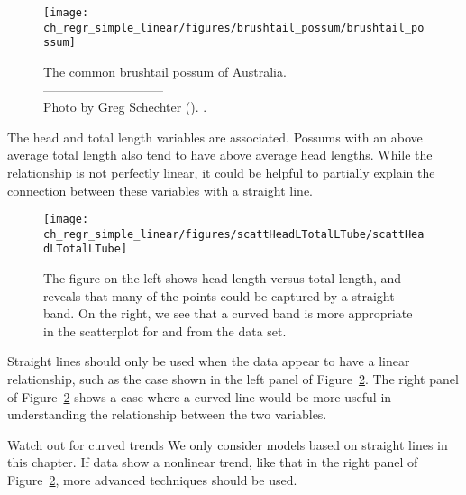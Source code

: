 \setlength{\captionwidth}{0.83\mycaptionwidth}
\begin{figure}
   \centering
   \texttt{[image: ch\_regr\_simple\_linear/figures/brushtail\_possum/brushtail\_possum]}
   \caption{The common brushtail possum of Australia.\vspace{-1mm} \\
   -----------------------------\vspace{-2mm}\\
   {\footnotesize Photo by Greg Schechter (). .}\vspace{-8mm}}
   \label{brushtail_possum}
\end{figure}
\setlength{\captionwidth}{\mycaptionwidth}

The head and total length variables are associated. Possums with an above average total length also tend to have above average head lengths. While the relationship is not perfectly linear, it could be helpful to partially explain the connection between these variables with a straight line.

\begin{figure}
   \centering
   \texttt{[image: ch\_regr\_simple\_linear/figures/scattHeadLTotalLTube/scattHeadLTotalLTube]}
   \caption{The figure on the left shows head length versus total length, and reveals that many of the points could be captured by a straight band. On the right, we see that a curved band is more appropriate in the scatterplot for  and  from the  data set.}
   \label{scattHeadLTotalLTube}
\end{figure}

Straight lines should only be used when the data appear to have a linear relationship, such as the case shown in the left panel of Figure~\ref{scattHeadLTotalLTube}. The right panel of Figure~\ref{scattHeadLTotalLTube} shows a case where a curved line would be more useful in understanding the relationship between the two variables.

\begin{caution}
{Watch out for curved trends}
{We only consider models based on straight lines in this chapter. If data show a nonlinear trend, like that in the right panel of Figure~\ref{scattHeadLTotalLTube}, more advanced techniques should be used.\vspace{0.7mm}}
\end{caution}

